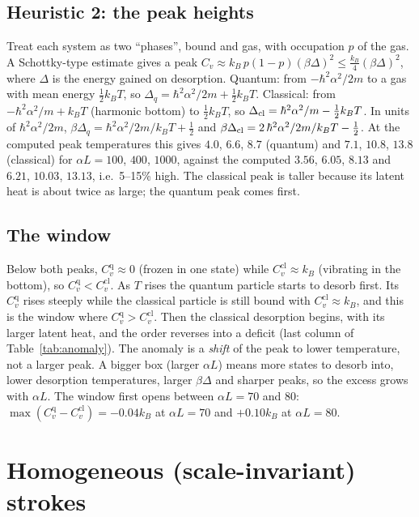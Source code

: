 \documentclass[11pt]{article}
\numberwithin{equation}{section}
\newcommand{\Cq}{C_v^{\mathrm{q}}}
\newcommand{\Ccl}{C_v^{\mathrm{cl}}}
\newcommand{\kB}{k_{B}}
\newcommand{\Eu}{\hbar^2\alpha^2/2m}
\begin{document}
\subsection{Heuristic 2: the peak heights}
Treat each system as two ``phases'', bound and gas, with occupation $p$ of the gas. A Schottky-type estimate gives a peak $C_v\approx\kB\,p(1-p)(\beta\Delta)^2\le\frac{\kB}{4}(\beta\Delta)^2$, where $\Delta$ is the energy gained on desorption. Quantum: from $-\hbar^2\alpha^2/2m$ to a gas with mean energy $\frac12\kB T$, so $\Delta_q=\Eu+\frac12\kB T$. Classical: from $-\hbar^2\alpha^2/m+\kB T$ (harmonic bottom) to $\frac12\kB T$, so $\Delta_{\rm cl}=\hbar^2\alpha^2/m-\frac12\kB T$. In units of $\Eu$, $\beta\Delta_q=\Eu/\kB T+\frac12$ and $\beta\Delta_{\rm cl}=2\,\Eu/\kB T-\frac12$. At the computed peak temperatures this gives $4.0$, $6.6$, $8.7$ (quantum) and $7.1$, $10.8$, $13.8$ (classical) for $\alpha L=100$, $400$, $1000$, against the computed $3.56$, $6.05$, $8.13$ and $6.21$, $10.03$, $13.13$, i.e.\ 5--15\% high. The classical peak is taller because its latent heat is about twice as large; the quantum peak comes first.

\subsection{The window}
Below both peaks, $\Cq\approx0$ (frozen in one state) while $\Ccl\approx\kB$ (vibrating in the bottom), so $\Cq<\Ccl$. As $T$ rises the quantum particle starts to desorb first. Its $\Cq$ rises steeply while the classical particle is still bound with $\Ccl\approx\kB$, and this is the window where $\Cq>\Ccl$. Then the classical desorption begins, with its larger latent heat, and the order reverses into a deficit (last column of Table~\ref{tab:anomaly}). The anomaly is a \emph{shift} of the peak to lower temperature, not a larger peak. A bigger box (larger $\alpha L$) means more states to desorb into, lower desorption temperatures, larger $\beta\Delta$ and sharper peaks, so the excess grows with $\alpha L$. The window first opens between $\alpha L=70$ and $80$: $\max(\Cq-\Ccl)=-0.04\kB$ at $\alpha L=70$ and $+0.10\kB$ at $\alpha L=80$.

\section{Homogeneous (scale-invariant) strokes}
\label{sec:stroke}
\end{document}
